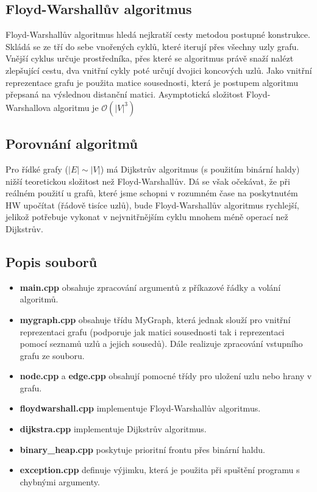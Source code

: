 \documentclass[a4paper,11pt]{article}
\begin{document}
\subsection{Floyd-Warshallův algoritmus}
Floyd-Warshallův algoritmus hledá nejkratší cesty metodou postupné konstrukce. Skládá se ze tří do sebe vnořených cyklů, které iterují přes všechny uzly grafu. Vnější cyklus určuje prostředníka, přes které se algoritmus právě snaží nalézt zlepšující cestu, dva vnitřní cykly poté určují dvojici koncových uzlů.
Jako vnitřní reprezentace grafu je použita matice sousednosti, která je postupem algoritmu přepsaná na výslednou distanční matici. Asymptotická složitost Floyd-Warshallova algoritmu je $\mathcal{O}(|V|^3)$

\subsection{Porovnání algoritmů}
Pro řídké grafy ($|E|\sim|V|$) má Dijkstrův algoritmus (s použitím binární haldy) nižší teoretickou složitost než Floyd-Warshallův. Dá se však očekávat, že při reálném použití u grafů, které jsme schopni v rozumném čase na poskytnutém HW upočítat (řádově tisíce uzlů), bude Floyd-Warshallův algoritmus rychlejší, jelikož potřebuje vykonat v nejvnitřnějším cyklu mnohem méně operací než Dijkstrův.

\subsection{Popis souborů}
\begin{itemize}
 \item \textbf{main.cpp} obsahuje zpracování argumentů z příkazové řádky a volání algoritmů.
 \item \textbf{mygraph.cpp} obsahuje třídu MyGraph, která jednak slouží pro vni\-třní reprezentaci grafu (podporuje jak matici sousednosti tak i reprezentaci pomocí seznamů uzlů a jejich sousedů). Dále realizuje zpracování vstupního grafu ze souboru.
 \item \textbf{node.cpp} a \textbf{edge.cpp} obsahují pomocné třídy pro uložení uzlu nebo hrany v grafu.
 \item \textbf{floydwarshall.cpp} implementuje Floyd-Warshallův algoritmus.
 \item \textbf{dijkstra.cpp} implementuje Dijkstrův algoritmus.
 \item \textbf{binary\_heap.cpp} poskytuje prioritní frontu přes binární haldu.
 \item \textbf{exception.cpp} definuje výjimku, která je použita při spuštění programu s chybnými argumenty.
\end{itemize}
\end{document}
